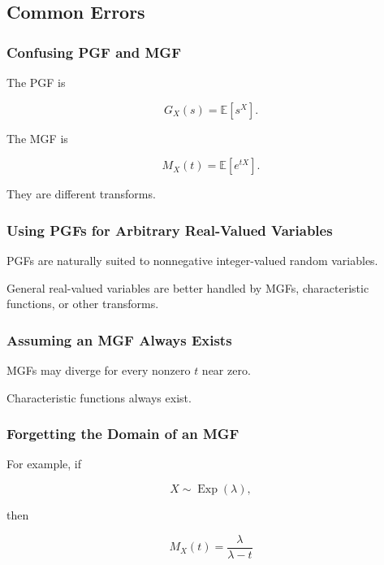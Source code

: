 \subsection{Common Errors}
\label{subsec:probability-transforms-common-errors}

\subsubsection{Confusing PGF and MGF}

The PGF is

\[
\boxed{
G_X(s)
=
\mathbb{E}[s^X].
}
\]

The MGF is

\[
\boxed{
M_X(t)
=
\mathbb{E}[e^{tX}].
}
\]

They are different transforms.

\subsubsection{Using PGFs for Arbitrary Real-Valued Variables}

PGFs are naturally suited to nonnegative integer-valued random
variables.

General real-valued variables are better handled by MGFs,
characteristic functions, or other transforms.

\subsubsection{Assuming an MGF Always Exists}

MGFs may diverge for every nonzero \(t\) near zero.

Characteristic functions always exist.

\subsubsection{Forgetting the Domain of an MGF}

For example, if

\[
X\sim\operatorname{Exp}(\lambda),
\]

then

\[
M_X(t)
=
\frac{\lambda}{\lambda-t}
\]

